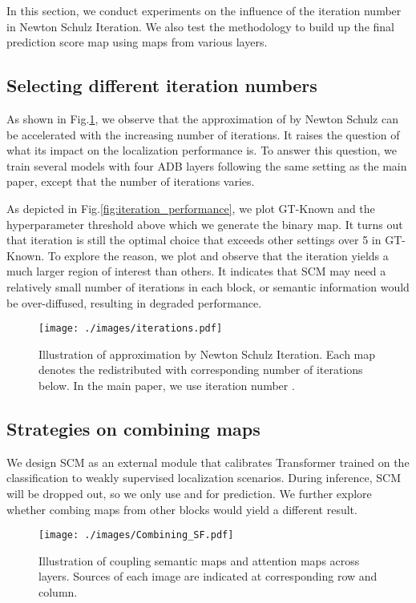 \documentclass[runningheads]{llncs}
\begin{document}
In this section, we conduct experiments on the influence of the iteration number in Newton Schulz Iteration. We also test the methodology to build up the final prediction score map using maps from various layers. 

\subsection{Selecting different iteration numbers}
As shown in Fig.\ref{fig:iterations}, we observe that the approximation of  by Newton Schulz can be accelerated with the increasing number of iterations. It raises the question of what its impact on the localization performance is. To answer this question, we train several models with four ADB layers following the same setting as the main paper, except that the number of iterations varies. 

As depicted in Fig.\ref{fig:iteration_performance}, we plot GT-Known and the hyperparameter threshold  above which we generate the binary map. It turns out that iteration  is still the optimal choice that exceeds other settings over 5 in GT-Known. To explore the reason, we plot  and observe that the iteration  yields a much larger region of interest than others. It indicates that SCM may need a relatively small number of iterations in each block, or semantic information would be over-diffused, resulting in degraded performance. 


\begin{figure}[t]
\centering
\texttt{[image: ./images/iterations.pdf]}
\caption{Illustration of approximation by Newton Schulz Iteration. Each map denotes the redistributed  with corresponding number of iterations  below. In the main paper, we use iteration number . }
\label{fig:iterations}
\end{figure}


\subsection{Strategies on combining maps}

We design SCM as an external module that calibrates Transformer trained on the classification to weakly supervised localization scenarios. During inference, SCM will be dropped out, so we only use  and  for prediction. We further explore whether combing maps from other blocks would yield a different result.

\begin{figure*}[th]
\centering
\texttt{[image: ./images/Combining\_SF.pdf]}
\caption{Illustration of coupling semantic maps and attention maps across layers. Sources of each image are indicated at corresponding row and column.} 
\label{fig:SF}
\end{figure*}
\end{document}
